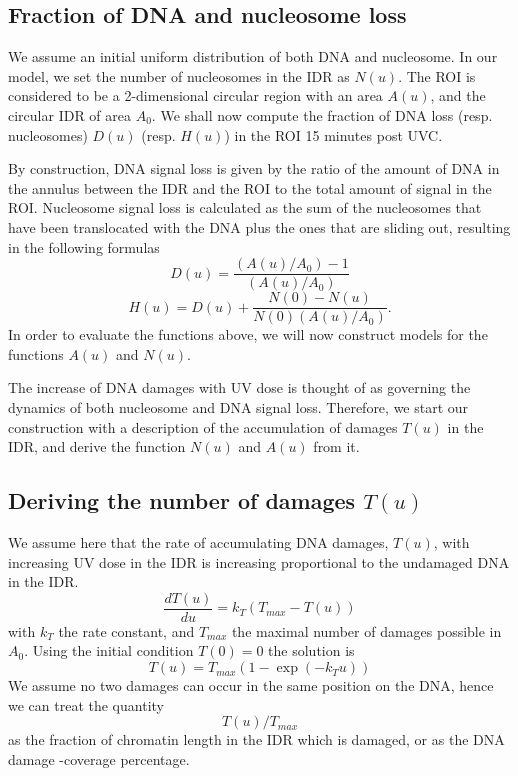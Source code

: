 \documentclass[12pt]{article}
\begin{document}
\subsection{Fraction of DNA and nucleosome loss }\label{subsection:fractionOfDNAandNucleosomeLoss}
We assume an initial uniform distribution of both DNA and nucleosome. 
In our model, we set the number of nucleosomes in the IDR as $N(u)$. The ROI is considered to be a 2-dimensional circular region with an area $A(u)$, and the circular IDR of area $A_0$. 
We shall now compute the fraction of DNA loss (resp. nucleosomes) $D(u)$ (resp. $H(u)$) in the ROI 15 minutes post UVC. 

By construction, DNA signal loss is given by the ratio of the amount of DNA in the annulus between the IDR and the ROI to the total amount of signal in the ROI. Nucleosome signal loss is calculated as the sum of the nucleosomes that have been translocated with the DNA plus the ones that are sliding out, resulting in the following formulas
\begin{equation}\label{eq:DNAStSt}
D(u)= \frac{(A(u)/A_0) -1}{(A(u)/A_0)}
\end{equation}
\begin{equation}
\label{eq:histoneStSt}
H(u)=D(u)+\frac{N(0)-N(u)}{N(0)(A(u)/A_0)}.
\end{equation}
In order to evaluate the functions above, we will now construct models for the functions $A(u)$ and $N(u)$.

The increase of DNA damages with UV dose is thought of as governing the dynamics of both nucleosome and DNA signal loss. Therefore, we start our construction with a description of the accumulation of damages $T(u)$ in the IDR, and derive the function $N(u)$ and $A(u)$ from it.

\subsection{Deriving the number of damages $T(u)$}
We assume here that the rate of accumulating DNA damages, $T(u)$, with increasing UV dose in the IDR is increasing proportional to the undamaged DNA in the IDR.
\begin{equation}
\frac{dT(u)}{du}=k_T\left(T_{max}-T(u)\right)
\end{equation}
with $k_T$ the rate constant, and $T_{max}$ the maximal number of damages possible in $A_0$. 
Using the initial condition $T(0) = 0$ the solution is
\begin{equation}
T(u) = T_{max}\left(1-\exp(-k_T u)\right) 
\end{equation}
We assume no two damages can occur in the same position on the DNA, hence we can treat the quantity 
\begin{equation*}
T(u)/T_{max}
\end{equation*}
as the fraction of chromatin length in the IDR which is damaged, or as the DNA damage -coverage percentage. 
\end{document}

